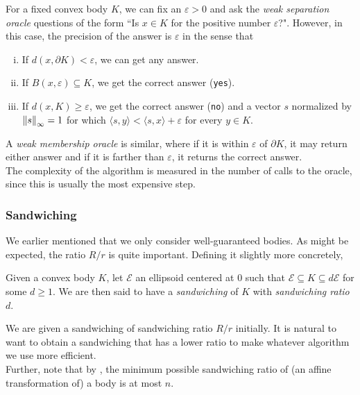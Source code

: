 \begin{definition}
For a fixed convex body $K$, we can fix an $\varepsilon>0$ and ask the \textit{weak separation oracle} questions of the form ``Is $x\in K$ for the positive number $\varepsilon$?". However, in this case, the precision of the answer is $\varepsilon$ in the sense that
\begin{enumerate}[(i)]
	\item If $d(x,\partial K)<\varepsilon$, we can get any answer.
	\item If $B(x,\varepsilon)\subseteq K$, we get the correct answer (\texttt{yes}).
	\item If $d(x,K)\geq\varepsilon$, we get the correct answer (\texttt{no}) and a vector $s$ normalized by $\left\lVert s\right\rVert_\infty=1$ for which $\langle s,y\rangle < \langle s,x\rangle+\varepsilon$ for every $y\in K$.
\end{enumerate}
\end{definition}

A \textit{weak membership oracle} is similar, where if it is within $\varepsilon$ of $\partial K$, it may return either answer and if it is farther than $\varepsilon$, it returns the correct answer.\\

The complexity of the algorithm is measured in the number of calls to the oracle, since this is usually the most expensive step.

\subsubsection{Sandwiching}
\label{sandwiching}

We earlier mentioned that we only consider well-guaranteed bodies. As might be expected, the ratio $R/r$ is quite important. Defining it slightly more concretely,

\begin{definition}
Given a convex body $K$, let $\mathcal{E}$ an ellipsoid centered at $0$ such that $\mathcal{E}\subseteq K\subseteq d\mathcal{E}$ for some $d\geq 1$. We are then said to have a \textit{sandwiching} of $K$ with \textit{sandwiching ratio} $d$.
\end{definition}

We are given a sandwiching of sandwiching ratio $R/r$ initially. It is natural to want to obtain a sandwiching that has a lower ratio to make whatever algorithm we use more efficient.\\
Further, note that by , the minimum possible sandwiching ratio of (an affine transformation of) a body is at most $n$.\\

